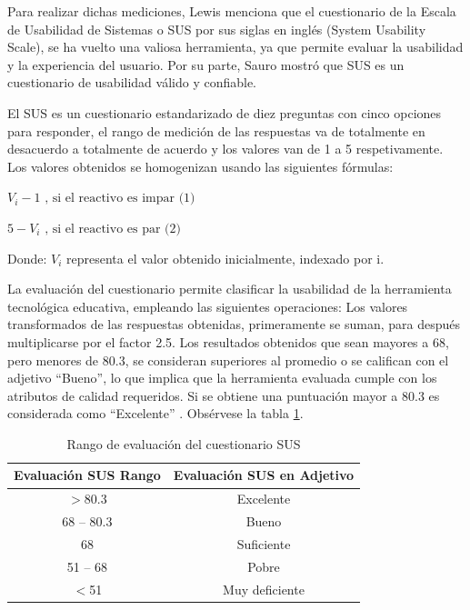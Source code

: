 \documentclass{article}
\begin{document}
Para realizar dichas mediciones, Lewis menciona \cite{lewis2018item} que el 
cuestionario de la Escala de Usabilidad de Sistemas o SUS por sus siglas en 
inglés (System Usability Scale), se ha vuelto una valiosa herramienta, ya que permite 
evaluar la usabilidad y la experiencia del usuario. Por su parte, Sauro 
mostró \cite{sauro2011measuring} que SUS es un cuestionario de usabilidad válido y 
confiable. 

El SUS es un cuestionario estandarizado de diez preguntas con cinco opciones 
para responder, el rango de medición de las respuestas va de totalmente en desacuerdo 
a totalmente de acuerdo y los valores van de 1 a 5 respetivamente. Los valores 
obtenidos se homogenizan  usando las siguientes fórmulas: 

\begin{center}
$ V_{i}-1 \textrm{ , si el reactivo es impar (1)} $

$ 5-V_{i} \textrm{ , si el reactivo es par (2)} $
\end{center}

Donde: $V_{i}$ representa el valor obtenido inicialmente, indexado por i.

La evaluación del cuestionario permite clasificar la usabilidad de la herramienta 
tecnológica educativa, empleando las siguientes operaciones: Los valores transformados 
de las respuestas obtenidas, primeramente se suman, para después multiplicarse por 
el factor 2.5. Los resultados obtenidos que sean mayores a 68, pero menores de 80.3, 
se consideran superiores al promedio o se califican con el adjetivo “Bueno”, lo que 
implica que la herramienta evaluada cumple con los atributos de calidad requeridos. 
Si se obtiene una puntuación mayor a 80.3 es considerada como “Excelente” 
\cite{derisma2020usability}. 
Obsérvese la tabla \ref{tab:pruebas01}.

\begin{table}[H]
\caption{Rango de evaluación del cuestionario SUS}
\centering
\begin{tabular}{|c|c|}
\hline
Evaluación SUS Rango & Evaluación SUS en Adjetivo \\ \hline
$>$80.3 & Excelente \\ \hline
68 – 80.3 & Bueno \\ \hline
68	& Suficiente \\ \hline 
51 – 68 & Pobre \\ \hline 
$<$51 & Muy deficiente \\ \hline
\end{tabular}

\label{tab:pruebas01}
\end{table}
\end{document}
